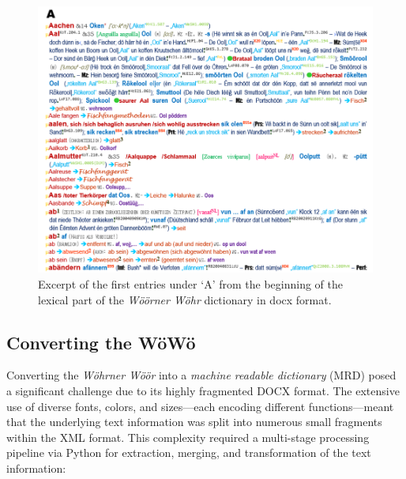 \documentclass{article}
\begin{document}
\begin{figure}
    \centering
    \includegraphics[width=1\linewidth]{woewoe_excerpt.png}
    \caption{Excerpt of the first entries under ‘A’ from the beginning of the lexical part of the \emph{Wöörner Wöhr} dictionary in docx format.}
    \label{fig:enter-label}
\end{figure}

\subsection{Converting the WöWö}

Converting the \emph{Wöhrner Wöör} into a \emph{machine readable dictionary} (MRD) posed a significant challenge due to its highly fragmented DOCX format. The extensive use of diverse fonts, colors, and sizes—each encoding different functions—meant that the underlying text information was split into numerous small fragments within the XML format. This complexity required a multi-stage processing pipeline via Python for extraction, merging, and transformation of the text information:
\end{document}
